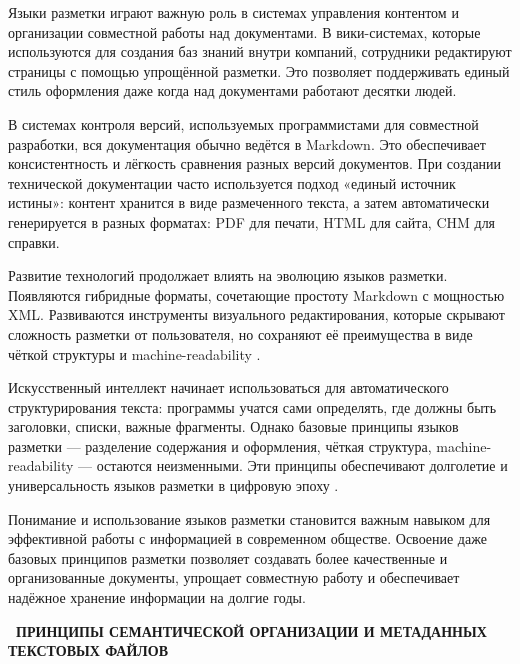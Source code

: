 \documentclass{SibFU-docs}
\begin{document}
Языки разметки играют важную роль в системах управления контентом и организации совместной работы над документами. В вики-системах, которые используются для создания баз знаний внутри компаний, сотрудники редактируют страницы с помощью упрощённой разметки. Это позволяет поддерживать единый стиль оформления даже когда над документами работают десятки людей.

В системах контроля версий, используемых программистами для совместной разработки, вся документация обычно ведётся в Markdown. Это обеспечивает консистентность и лёгкость сравнения разных версий документов. При создании технической документации часто используется подход «единый источник истины»: контент хранится в виде размеченного текста, а затем автоматически генерируется в разных форматах: PDF для печати, HTML для сайта, CHM для справки.


Развитие технологий продолжает влиять на эволюцию языков разметки. Появляются гибридные форматы, сочетающие простоту Markdown с мощностью XML. Развиваются инструменты визуального редактирования, которые скрывают сложность разметки от пользователя, но сохраняют её преимущества в виде чёткой структуры и machine-readability \cite{markdown_yaml, xml_w3c}.

Искусственный интеллект начинает использоваться для автоматического структурирования текста: программы учатся сами определять, где должны быть заголовки, списки, важные фрагменты. Однако базовые принципы языков разметки — разделение содержания и оформления, чёткая структура, machine-readability — остаются неизменными. Эти принципы обеспечивают долголетие и универсальность языков разметки в цифровую эпоху \cite{bernerslee2001semanticweb}.

Понимание и использование языков разметки становится важным навыком для эффективной работы с информацией в современном обществе. Освоение даже базовых принципов разметки позволяет создавать более качественные и организованные документы, упрощает совместную работу и обеспечивает надёжное хранение информации на долгие годы.

\newpage
{}
\begin{center}\textbf{\thesection\ ПРИНЦИПЫ СЕМАНТИЧЕСКОЙ ОРГАНИЗАЦИИ И МЕТАДАННЫХ ТЕКСТОВЫХ ФАЙЛОВ}\end{center}
\vspace*{-1.5em}
\end{document}
